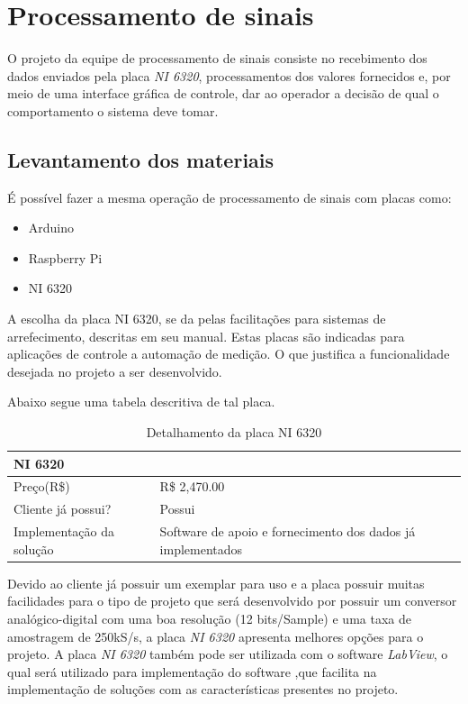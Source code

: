 \section{Processamento de sinais}


O projeto da equipe de processamento de sinais consiste no recebimento dos dados enviados pela placa \textit{NI 6320}, processamentos dos valores fornecidos e, por meio de uma interface gráfica de controle, dar ao operador a decisão de qual o comportamento o sistema deve tomar.

\subsection{Levantamento dos materiais}

É possível fazer a mesma operação de processamento de sinais com placas como:
\begin{itemize}
    \item Arduino
    \item Raspberry Pi
    \item NI 6320
    
\end{itemize}

A escolha da placa NI 6320, se da pelas facilitações para sistemas de arrefecimento, descritas em seu manual. Estas placas são indicadas para aplicações de controle a automação de medição. O que justifica a funcionalidade desejada no projeto a ser desenvolvido.


Abaixo segue uma tabela descritiva de tal placa.

    \begin{table}[htb]
        \centering
        \begin{tabular}{|p{3cm}|p{3cm}|}
        \hline
        NI 6320  & \\ \hline
        Preço(R\$) & R\$ 2,470.00 \\ \hline
        Cliente já possui? & Possui \\ \hline
        Implementação da solução & Software de apoio e fornecimento dos dados já implementados\\ \hline
        \end{tabular}
        \caption{Detalhamento da placa NI 6320}
        \end{table}


Devido ao cliente já possuir um exemplar para uso e a placa possuir muitas facilidades para o tipo de projeto que será desenvolvido por possuir um conversor analógico-digital com uma boa resolução (12 bits/Sample) e uma taxa de amostragem de 250kS/s, a placa \textit{NI 6320} apresenta melhores opções para o projeto.
A placa \textit{NI 6320} também pode ser utilizada com o software \textit{LabView}, o qual será utilizado para implementação do software ,que facilita na implementação de soluções com as características presentes no projeto.


